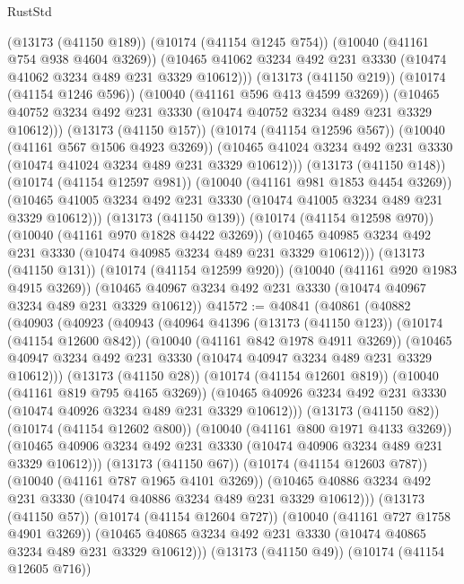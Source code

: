 \begin{lexlean}{RustStd}
\begin{coremodule}
              (@13173 (@41150 @189))
              (@10174 (@41154 @1245 @754))
              (@10040 (@41161 @754 @938 @4604 @3269))
              (@10465 @41062 @3234 @492 @231 @3330 (@10474 @41062 @3234 @489 @231 @3329 @10612)))
            (@13173 (@41150 @219))
            (@10174 (@41154 @1246 @596))
            (@10040 (@41161 @596 @413 @4599 @3269))
            (@10465 @40752 @3234 @492 @231 @3330 (@10474 @40752 @3234 @489 @231 @3329 @10612)))
          (@13173 (@41150 @157))
          (@10174 (@41154 @12596 @567))
          (@10040 (@41161 @567 @1506 @4923 @3269))
          (@10465 @41024 @3234 @492 @231 @3330 (@10474 @41024 @3234 @489 @231 @3329 @10612)))
        (@13173 (@41150 @148))
        (@10174 (@41154 @12597 @981))
        (@10040 (@41161 @981 @1853 @4454 @3269))
        (@10465 @41005 @3234 @492 @231 @3330 (@10474 @41005 @3234 @489 @231 @3329 @10612)))
      (@13173 (@41150 @139))
      (@10174 (@41154 @12598 @970))
      (@10040 (@41161 @970 @1828 @4422 @3269))
      (@10465 @40985 @3234 @492 @231 @3330 (@10474 @40985 @3234 @489 @231 @3329 @10612)))
    (@13173 (@41150 @131))
    (@10174 (@41154 @12599 @920))
    (@10040 (@41161 @920 @1983 @4915 @3269))
    (@10465 @40967 @3234 @492 @231 @3330 (@10474 @40967 @3234 @489 @231 @3329 @10612))
@41572 := @40841
    (@40861
      (@40882
        (@40903
          (@40923
            (@40943
              (@40964
                @41396
                (@13173 (@41150 @123))
                (@10174 (@41154 @12600 @842))
                (@10040 (@41161 @842 @1978 @4911 @3269))
                (@10465 @40947 @3234 @492 @231 @3330 (@10474 @40947 @3234 @489 @231 @3329 @10612)))
              (@13173 (@41150 @28))
              (@10174 (@41154 @12601 @819))
              (@10040 (@41161 @819 @795 @4165 @3269))
              (@10465 @40926 @3234 @492 @231 @3330 (@10474 @40926 @3234 @489 @231 @3329 @10612)))
            (@13173 (@41150 @82))
            (@10174 (@41154 @12602 @800))
            (@10040 (@41161 @800 @1971 @4133 @3269))
            (@10465 @40906 @3234 @492 @231 @3330 (@10474 @40906 @3234 @489 @231 @3329 @10612)))
          (@13173 (@41150 @67))
          (@10174 (@41154 @12603 @787))
          (@10040 (@41161 @787 @1965 @4101 @3269))
          (@10465 @40886 @3234 @492 @231 @3330 (@10474 @40886 @3234 @489 @231 @3329 @10612)))
        (@13173 (@41150 @57))
        (@10174 (@41154 @12604 @727))
        (@10040 (@41161 @727 @1758 @4901 @3269))
        (@10465 @40865 @3234 @492 @231 @3330 (@10474 @40865 @3234 @489 @231 @3329 @10612)))
      (@13173 (@41150 @49))
      (@10174 (@41154 @12605 @716))

\end{coremodule}
\end{lexlean}
